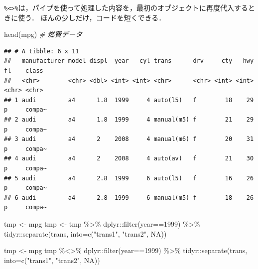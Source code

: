 \documentclass[
]{article}
\newenvironment{Shaded}{\begin{snugshade}}{\end{snugshade}}
\newcommand{\AttributeTok}[1]{\textcolor[rgb]{0.77,0.63,0.00}{#1}}
\newcommand{\CommentTok}[1]{\textcolor[rgb]{0.56,0.35,0.01}{\textit{#1}}}
\newcommand{\ConstantTok}[1]{\textcolor[rgb]{0.00,0.00,0.00}{#1}}
\newcommand{\DecValTok}[1]{\textcolor[rgb]{0.00,0.00,0.81}{#1}}
\newcommand{\FunctionTok}[1]{\textcolor[rgb]{0.00,0.00,0.00}{#1}}
\newcommand{\NormalTok}[1]{#1}
\newcommand{\OtherTok}[1]{\textcolor[rgb]{0.56,0.35,0.01}{#1}}
\newcommand{\SpecialCharTok}[1]{\textcolor[rgb]{0.00,0.00,0.00}{#1}}
\newcommand{\StringTok}[1]{\textcolor[rgb]{0.31,0.60,0.02}{#1}}
\begin{document}
\texttt{\%\textless{}\textgreater{}\%}は，パイプを使って処理した内容を，最初のオブジェクトに再度代入するときに使う．
ほんの少しだけ，コードを短くできる．

\begin{Shaded}
\begin{Highlighting}[]
\FunctionTok{head}\NormalTok{(mpg) }\CommentTok{\# 燃費データ}
\end{Highlighting}
\end{Shaded}

\begin{verbatim}
## # A tibble: 6 x 11
##   manufacturer model displ  year   cyl trans      drv     cty   hwy fl    class 
##   <chr>        <chr> <dbl> <int> <int> <chr>      <chr> <int> <int> <chr> <chr> 
## 1 audi         a4      1.8  1999     4 auto(l5)   f        18    29 p     compa~
## 2 audi         a4      1.8  1999     4 manual(m5) f        21    29 p     compa~
## 3 audi         a4      2    2008     4 manual(m6) f        20    31 p     compa~
## 4 audi         a4      2    2008     4 auto(av)   f        21    30 p     compa~
## 5 audi         a4      2.8  1999     6 auto(l5)   f        16    26 p     compa~
## 6 audi         a4      2.8  1999     6 manual(m5) f        18    26 p     compa~
\end{verbatim}

\begin{Shaded}
\begin{Highlighting}[]
\NormalTok{tmp }\OtherTok{\textless{}{-}}\NormalTok{ mpg}
\NormalTok{tmp }\OtherTok{\textless{}{-}}
\NormalTok{  tmp }\SpecialCharTok{\%\textgreater{}\%}
\NormalTok{  dplyr}\SpecialCharTok{::}\FunctionTok{filter}\NormalTok{(year}\SpecialCharTok{==}\DecValTok{1999}\NormalTok{) }\SpecialCharTok{\%\textgreater{}\%}
\NormalTok{  tidyr}\SpecialCharTok{::}\FunctionTok{separate}\NormalTok{(trans, }\AttributeTok{into=}\FunctionTok{c}\NormalTok{(}\StringTok{"trans1"}\NormalTok{, }\StringTok{"trans2"}\NormalTok{, }\ConstantTok{NA}\NormalTok{))}

\NormalTok{tmp }\OtherTok{\textless{}{-}}\NormalTok{ mpg}
\NormalTok{tmp }\SpecialCharTok{\%\textless{}\textgreater{}\%}
\NormalTok{  dplyr}\SpecialCharTok{::}\FunctionTok{filter}\NormalTok{(year}\SpecialCharTok{==}\DecValTok{1999}\NormalTok{) }\SpecialCharTok{\%\textgreater{}\%}
\NormalTok{  tidyr}\SpecialCharTok{::}\FunctionTok{separate}\NormalTok{(trans, }\AttributeTok{into=}\FunctionTok{c}\NormalTok{(}\StringTok{"trans1"}\NormalTok{, }\StringTok{"trans2"}\NormalTok{, }\ConstantTok{NA}\NormalTok{))}
\end{Highlighting}
\end{Shaded}
\end{document}
